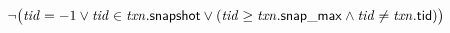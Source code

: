 
\begin{algorithm}[H]
  \begin{algorithmic}[1]
    \Procedure{\txnvis}{$\txnvar, \tidvar$}
      \State \Return
        $\lnot \big(\mathit{tid} = -1
        \lor \mathit{tid} \in \mathit{txn}.{\sf snapshot}
        \lor (\mathit{tid} \ge \mathit{txn}.{\sf snap\_max} \land \mathit{tid} \neq \mathit{txn}.{\sf tid})\big)$
    \EndProcedure
  \end{algorithmic}
\end{algorithm}